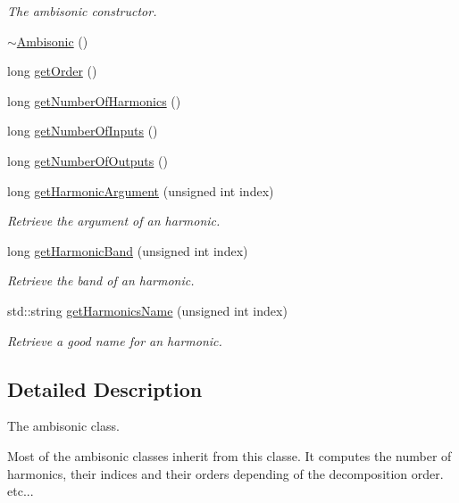 \begin{DoxyCompactItemize}
\begin{DoxyCompactList}\small\item\em The ambisonic constructor. \end{DoxyCompactList}\item 
\hyperlink{class_hoa3_d_1_1_ambisonic_aef717915cc52d318b5b40af88c38c722}{$\sim$\-Ambisonic} ()
\item 
long \hyperlink{class_hoa3_d_1_1_ambisonic_abe3b53fb4a6e7b63eee582a026987458}{get\-Order} ()
\item 
long \hyperlink{class_hoa3_d_1_1_ambisonic_a0688ea4e2401eda492a813da8b800568}{get\-Number\-Of\-Harmonics} ()
\item 
long \hyperlink{class_hoa3_d_1_1_ambisonic_abe5de38dd1df17edf369732b46b8e1ad}{get\-Number\-Of\-Inputs} ()
\item 
long \hyperlink{class_hoa3_d_1_1_ambisonic_a7a13c6e5ac82f4279d78d4d9f2a31560}{get\-Number\-Of\-Outputs} ()
\item 
long \hyperlink{class_hoa3_d_1_1_ambisonic_a01a38c7f5f505d7fd5e6ef4af513628a}{get\-Harmonic\-Argument} (unsigned int index)
\begin{DoxyCompactList}\small\item\em Retrieve the argument of an harmonic. \end{DoxyCompactList}\item 
long \hyperlink{class_hoa3_d_1_1_ambisonic_ac5dd2285bbfdfdfe45b11d39379a0974}{get\-Harmonic\-Band} (unsigned int index)
\begin{DoxyCompactList}\small\item\em Retrieve the band of an harmonic. \end{DoxyCompactList}\item 
std\-::string \hyperlink{class_hoa3_d_1_1_ambisonic_a33ce838226f9c12ffc49ed5d78a244b1}{get\-Harmonics\-Name} (unsigned int index)
\begin{DoxyCompactList}\small\item\em Retrieve a good name for an harmonic. \end{DoxyCompactList}\end{DoxyCompactItemize}


\subsection{Detailed Description}
The ambisonic class. 

Most of the ambisonic classes inherit from this classe. It computes the number of harmonics, their indices and their orders depending of the decomposition order. etc... 

